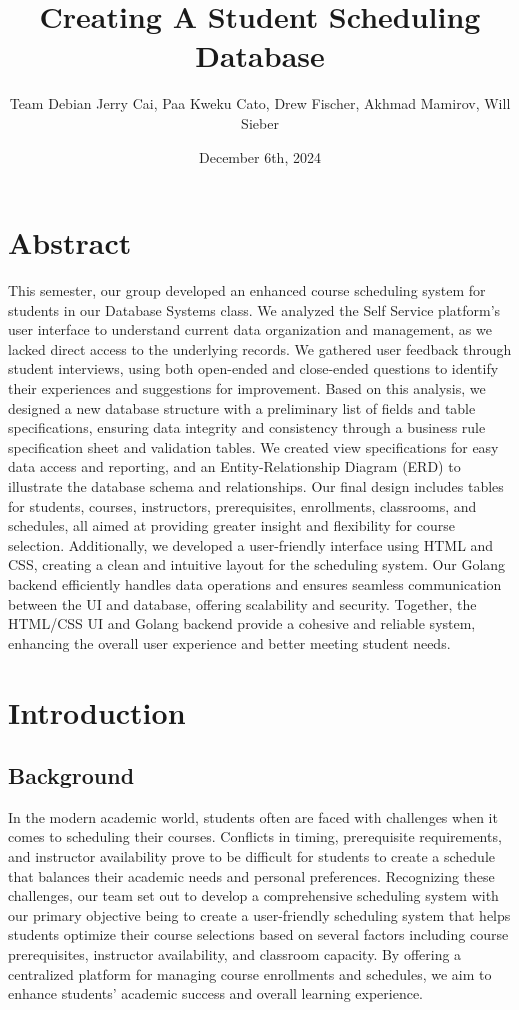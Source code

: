 \documentclass[12pt]{article}
\title{Creating A Student Scheduling Database}
\date{December 6th, 2024}
\author{\parbox{\linewidth}{\centering%
	Team Debian
	\endgraf\bigskip
	Jerry Cai, Paa Kweku Cato, Drew Fischer, Akhmad Mamirov, Will Sieber
	\bigskip
}}
\begin{document}
\maketitle

\newpage
\tableofcontents
\newpage

\section{Abstract}
This semester, our group developed an enhanced course scheduling system for students in our Database Systems class. We analyzed the Self Service platform’s user interface to understand current data organization and management, as we lacked direct access to the underlying records. We gathered user feedback through student interviews, using both open-ended and close-ended questions to identify their experiences and suggestions for improvement. Based on this analysis, we designed a new database structure with a preliminary list of fields and table specifications, ensuring data integrity and consistency through a business rule specification sheet and validation tables. We created view specifications for easy data access and reporting, and an Entity-Relationship Diagram (ERD) to illustrate the database schema and relationships. Our final design includes tables for students, courses, instructors, prerequisites, enrollments, classrooms, and schedules, all aimed at providing greater insight and flexibility for course selection. Additionally, we developed a user-friendly interface using HTML and CSS, creating a clean and intuitive layout for the scheduling system. Our Golang backend efficiently handles data operations and ensures seamless communication between the UI and database, offering scalability and security. Together, the HTML/CSS UI and Golang backend provide a cohesive and reliable system, enhancing the overall user experience and better meeting student needs.

\newpage

\section{Introduction}

\subsection{Background}
In the modern academic world, students often are faced with challenges when it comes to scheduling their courses. Conflicts in timing, prerequisite requirements, and instructor availability prove to be difficult for students to create a schedule that balances their academic needs and personal preferences. Recognizing these challenges, our team set out to develop a comprehensive scheduling system with our primary objective being to create a user-friendly scheduling system that helps students optimize their course selections based on several factors including course prerequisites, instructor availability, and classroom capacity. By offering a centralized platform for managing course enrollments and schedules, we aim to enhance students' academic success and overall learning experience.
\end{document}
